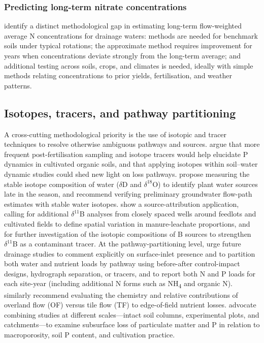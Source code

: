 \documentclass[11pt]{article}
\begin{document}
\subsubsection{Predicting long-term nitrate concentrations}

\textcite{Skaggs2012} identify a distinct methodological gap in estimating long-term flow-weighted average N concentrations for drainage waters: methods are needed for benchmark soils under typical rotations; the approximate method requires improvement for years when concentrations deviate strongly from the long-term average; and additional testing across soils, crops, and climates is needed, ideally with simple methods relating concentrations to prior yields, fertilisation, and weather patterns.

\subsection{Isotopes, tracers, and pathway partitioning}

A cross-cutting methodological priority is the use of isotopic and tracer techniques to resolve otherwise ambiguous pathways and sources. \textcite{Grenon2022} argue that more frequent post-fertilisation sampling and isotope tracers would help elucidate P dynamics in cultivated organic soils, and that applying isotopes within soil--water dynamic studies could shed new light on loss pathways. \textcite{Islam2022} propose measuring the stable isotope composition of water ($\delta$D and $\delta^{18}$O) to identify plant water sources late in the season, and \textcite{YliHalla2022} recommend verifying preliminary groundwater flow-path estimates with stable water isotopes. \textcite{Komor1997} show a source-attribution application, calling for additional $\delta^{11}$B analyses from closely spaced wells around feedlots and cultivated fields to define spatial variation in manure-leachate proportions, and for further investigation of the isotopic compositions of B sources to strengthen $\delta^{11}$B as a contaminant tracer. At the pathway-partitioning level, \textcite{Flores2021} urge future drainage studies to comment explicitly on surface-inlet presence and to partition both water and nutrient loads by pathway using before-after control-impact designs, hydrograph separation, or tracers, and to report both N and P loads for each site-year (including additional N forms such as NH\textsubscript{4} and organic N). \textcite{Kokulan2019} similarly recommend evaluating the chemistry and relative contributions of overland flow (OF) versus tile flow (TF) to edge-of-field nutrient losses. \textcite{Laubel1999} advocate combining studies at different scales---intact soil columns, experimental plots, and catchments---to examine subsurface loss of particulate matter and P in relation to macroporosity, soil P content, and cultivation practice.
\end{document}
